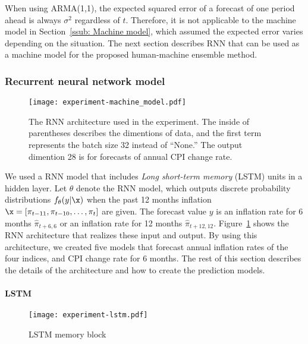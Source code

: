 \documentclass[../main.tex]{subfiles}
\begin{document}
When using ARMA(1,1), the expected squared error of a forecast of one period ahead is always $\sigma^2$ regardless of $t$.
Therefore, it is not applicable to the machine model in Section~\ref{ssub: Machine model}, which assumed the expected error varies depending on the situation.
The next section describes RNN that can be used as a machine model for the proposed human-machine ensemble method.

\subsubsection{Recurrent neural network model}
\label{ssub: Recurrent neural network model}

\begin{figure}
  \centering
  \texttt{[image: experiment-machine\_model.pdf]}
  \caption{
    The RNN architecture used in the experiment.
    The inside of parentheses describes the dimentions of data, and the first term represents the batch size 32 instead of ``None.''
    The output dimention 28 is for forecasts of annual CPI change rate.
  }\label{fig: RNN architecture}
\end{figure}

We used a RNN model that includes \emph{Long short-term memory} (LSTM) units in a hidden layer.
Let $\theta$ denote the RNN model, which outputs discrete probability distributions $f_\theta(y|\x)$ when the past 12 months inflation $\x = [\pi_{t-11}, \pi_{t-10}, \dots, \pi_t]$ are given.
The forecast value $y$ is an inflation rate for 6 months $\hat{\pi}_{t+6,6}$ or an inflation rate for 12 months $\hat{\pi}_{t+12,12}$.
Figure~\ref{fig: RNN architecture} shows the RNN architecture that realizes these input and output.
By using this architecture, we created five models that forecast annual inflation rates of the four indices, and CPI change rate for 6 months.
The rest of this section describes the details of the architecture and how to create the prediction models.

\paragraph{LSTM}

\begin{figure}
  \centering
  \texttt{[image: experiment-lstm.pdf]}
  \caption{
    LSTM memory block~\cite{Graves2012}
  }\label{fig: LSTM}
\end{figure}
\end{document}
